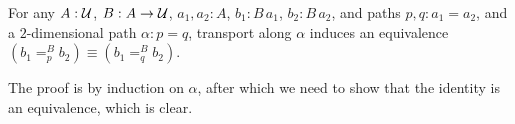 \documentclass[a4,12pt]{amsart}
\begin{document}
\begin{lemma}\label{lem:pathover-change-path}
  For any $A : \mathcal{U}$, $B : A \to \mathcal{U}$, $a_1,a_2 : A$, $b_1 : B\,a_1$, $b_2: B\,a_2$,
  and paths $p,q:a_1=a_2$, and a $2$-dimensional path $\alpha : p = q$,
  transport along $\alpha$
  induces an equivalence $(b_1 =^B_p b_2) \equiv (b_1 =^B_q b_2)$.
\end{lemma}
The proof is by induction on $\alpha$, after which we need to show that the identity is an equivalence, which is clear.





\end{document}
